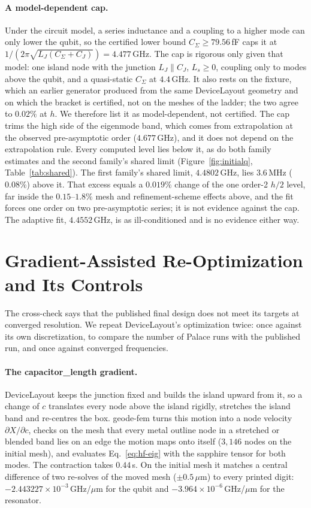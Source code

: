 \documentclass{anvil-paper}
\begin{document}
\paragraph{A model-dependent cap.}
Under the circuit model, a series inductance and a coupling to a higher
mode can only lower the qubit, so the certified lower bound $C_\Sigma \ge
79.56$\,fF caps it at $1/(2\pi\sqrt{L_J(C_\Sigma + C_J)}) = 4.477$\,GHz.
The cap is rigorous only given that model: one island node with the
junction $L_J \parallel C_J$, $L_s \ge 0$, coupling only to modes above the
qubit, and a quasi-static $C_\Sigma$ at $4.4$\,GHz. It also rests on the
fixture, which an earlier generator produced from the same DeviceLayout
geometry and on which the bracket is certified, not on the meshes of the
ladder; the two agree to $0.02\%$ at $h$. We therefore list it as
model-dependent, not certified. The cap trims the high side of the eigenmode
band, which comes from extrapolation at the observed pre-asymptotic order
($4.677$\,GHz), and it does not depend on the extrapolation rule. Every
computed level lies below it, as do both family estimates and the second
family's shared limit (Figure~\ref{fig:initialq}, Table~\ref{tab:shared}).
The first family's shared limit, $4.4802$\,GHz, lies $3.6$\,MHz ($0.08\%$)
above it. That excess equals a $0.019\%$ change of the one order-2 $h/2$
level, far inside the $0.15$--$1.8\%$ mesh and refinement-scheme effects
above, and the fit forces one order on two pre-asymptotic series; it is
not evidence against the cap. The adaptive fit, $4.4552$\,GHz, is as
ill-conditioned and is no evidence either way.

\section{Gradient-Assisted Re-Optimization and Its Controls}
\label{sec:reopt}

The cross-check says that the published final design does not meet its
targets at converged resolution. We repeat DeviceLayout's optimization
twice: once against its own discretization, to compare the number of
Palace runs with the published run, and once against converged
frequencies.

\paragraph{The capacitor\_length gradient.}
DeviceLayout keeps the junction fixed and builds the island upward from
it, so a change of $c$ translates every node above the island rigidly,
stretches the island band and re-centres the box. geode-fem turns this
motion into a node velocity $\partial X/\partial c$, checks on the mesh
that every metal outline node in a stretched or blended band lies on an
edge the motion maps onto itself ($3{,}146$ nodes on the initial mesh),
and evaluates Eq.~\eqref{eq:hf-eig} with the sapphire tensor for both
modes. The contraction takes $0.44$\,s. On the initial mesh it matches a
central difference of two re-solves of the moved mesh ($\pm0.5\,\mu$m) to
every printed digit: $-2.443227\times10^{-3}$\,GHz/$\mu$m for the qubit
and $-3.964\times10^{-6}$\,GHz/$\mu$m for the resonator.
\end{document}
